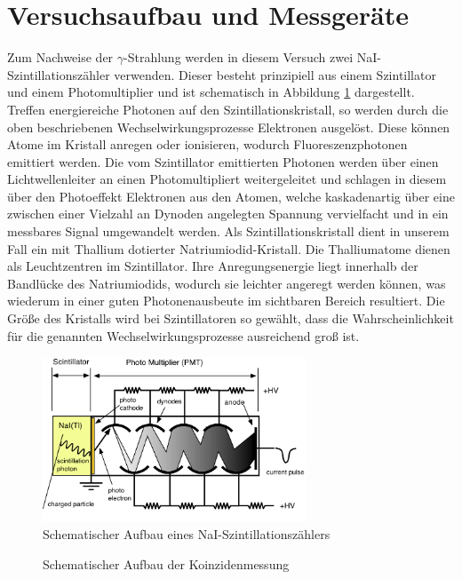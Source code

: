 \documentclass[11pt]{scrartcl}
\begin{document}
\section{Versuchsaufbau und Messgeräte}

Zum Nachweise der $\gamma$-Strahlung werden in diesem Versuch zwei NaI-Szintillationszähler verwenden. Dieser besteht prinzipiell aus einem Szintillator und einem Photomultiplier und ist schematisch in Abbildung \ref{PMT} dargestellt. Treffen energiereiche Photonen auf den Szintillationskristall, so werden durch die oben beschriebenen Wechselwirkungsprozesse Elektronen ausgelöst. Diese können Atome im Kristall anregen oder ionisieren, wodurch Fluoreszenzphotonen emittiert werden. Die vom Szintillator emittierten Photonen werden über einen Lichtwellenleiter an einen Photomultipliert weitergeleitet und schlagen in diesem über den Photoeffekt Elektronen aus den Atomen, welche kaskadenartig über eine zwischen einer Vielzahl an Dynoden angelegten Spannung vervielfacht und in ein messbares Signal umgewandelt werden. Als Szintillationskristall dient in unserem Fall ein mit Thallium dotierter Natriumiodid-Kristall. Die Thalliumatome dienen als Leuchtzentren im Szintillator. Ihre Anregungsenergie liegt innerhalb der Bandlücke des Natriumiodids, wodurch sie leichter angeregt werden können, was wiederum in einer guten Photonenausbeute im sichtbaren Bereich resultiert. Die Größe des Kristalls wird bei Szintillatoren so gewählt, dass die Wahrscheinlichkeit für die genannten Wechselwirkungsprozesse ausreichend groß ist. 

\begin{figure}[htbp]  
     \includegraphics[width=0.7\textwidth]{PMT.png}
  \caption{Schematischer Aufbau eines NaI-Szintillationszählers \cite{PMT}}
  \label{PMT}
\end{figure}

\begin{figure}[htbp]  
     
  \caption{Schematischer Aufbau der Koinzidenmessung}
  \label{PMT2}
\end{figure}
\end{document}
